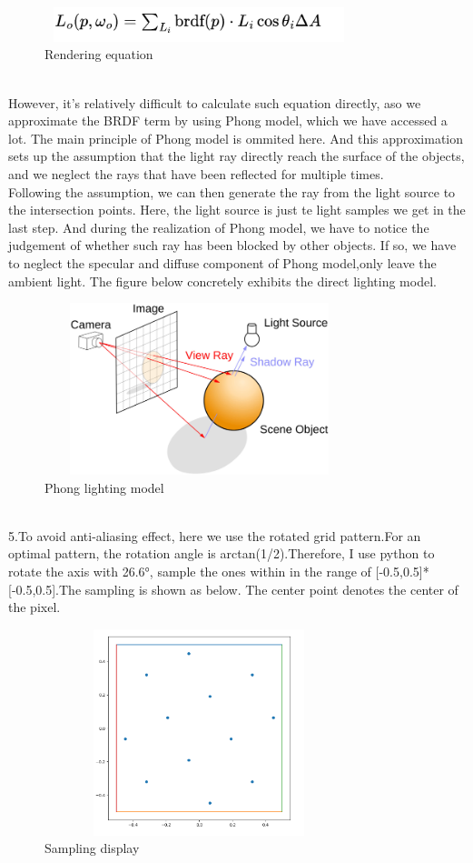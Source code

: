 \documentclass[acmtog]{acmart}
\begin{document}
\begin{figure}[h]
	\centering
	\includegraphics[width=9cm,height=1cm]{BRDF.PNG}
	\caption{Rendering equation}
\end{figure}
\\\indent However, it's relatively difficult to calculate such equation directly, aso we approximate the BRDF term by using Phong model, which we have accessed a lot. The main principle of Phong model is ommited here. And this approximation sets up the assumption that the light ray directly reach the surface of the objects, and we neglect the rays that have been reflected for multiple times.
\\\indent Following the assumption, we can then generate the ray from the light source to the intersection points. Here, the light source is just te light samples we get in the last step. And during the realization of Phong model, we have to notice the judgement of whether such ray has been blocked by other objects. If so, we have to neglect the specular and diffuse component of Phong model,only leave the ambient light. The figure below concretely exhibits the direct lighting model.
\begin{figure}[h]
	\centering
	\includegraphics[width=9cm,height=5cm]{model.png}
	\caption{Phong lighting model}
\end{figure}
\\\indent 5.To avoid anti-aliasing effect, here we use the rotated grid pattern.For an optimal pattern, the rotation angle is arctan(1/2).Therefore, I use python to rotate the axis with 26.6°, sample the ones within in the range of [-0.5,0.5]*[-0.5,0.5].The sampling is shown as below. The center point denotes the center of the pixel.
\begin{figure}[h]
	\centering
	\includegraphics[width=9cm,height=6cm]{Sampling.PNG}
	\caption{Sampling display}
\end{figure}
\end{document}
